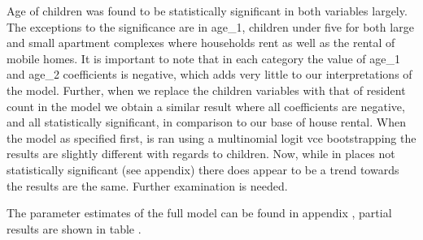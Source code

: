 \documentclass{article}
\begin{document}
Age of children was found to be statistically significant in both variables largely.  The exceptions to the significance are in age_1, children under five for both large and small apartment complexes where households rent as well as the rental of mobile homes.  It is important to note that in each category the value of age_1 and age_2 coefficients is negative, which adds very little to our interpretations of the model.  Further, when we replace the children variables with that of resident count in the model we obtain a similar result where all coefficients are negative, and all statistically significant, in comparison to our base of house rental. 
When the model as specified first, is ran using a multinomial logit vce bootstrapping the results are slightly different with regards to children.  Now, while in places not statistically significant (see appendix) there does appear to be a trend towards the results are the same.  Further examination is needed.

The parameter estimates of the full model can be found in appendix 
, partial results are shown in table 
.
  
\end{document}
